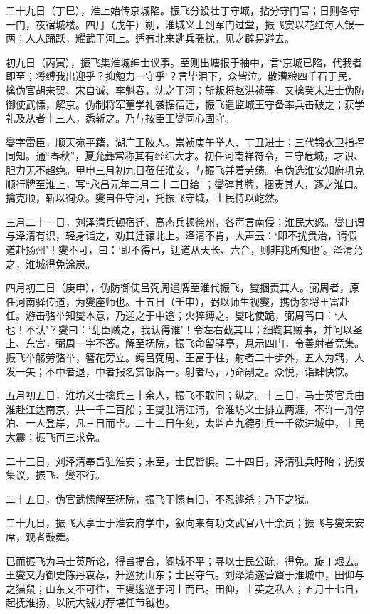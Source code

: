 \documentclass[]{article}
\begin{document}
二十九日（丁巳），淮上始传京城陷。振飞分设壮丁守城，拈分守门官；日则各守一门，夜宿城楼。四月（戊午）朔，淮城义士到军门过堂，振飞赏以花红每人银一两；人人踊跃，耀武于河上。适有北来逃兵骚扰，见之辟易避去。

初九日（丙寅），振飞集淮城绅士议事。至则出塘报于袖中，言`京城已陷，代我者即至；将缚我出迎乎？抑勉力一守乎'？言毕泪下，众皆泣。散漕粮四千石于民，擒伪官胡来贺、宋自诚、李魁春，沈之于河；斩叛将赵洪祯等，又擒癸未进士伪防御使武愫，解京。伪制将军董学礼袭据宿迁，振飞遣监城王守备率兵击破之；获学礼及从者十三人，悉斩之。乃与按臣王燮同心固守。

燮字雷臣，顺天宛平籍，湖广王陂人。崇祯庚午举人、丁丑进士；三代锦衣卫指挥同知。通``春秋''，夏允彝常称其有经纬大才。初任河南祥符令，三守危城，才识、胆力无不超绝。甲申三月初九日莅任淮安，与振飞并着劳绩。有伪选淮安知府巩克顺行牌至淮上，写``永昌元年二月二十二日给''；燮碎其牌，捆责其人，逐之淮口。擒克顺，斩以徇众。燮自任守河，托振飞守城，士民恃以屹然。

三月二十一日，刘泽清兵顿宿迁、高杰兵顿徐州，各声言南侵；淮民大怒。燮自谓与泽清有识，轻身诣之，劝其迁辕北上。泽清不肯，大声云：`即不扰贵治，请假道赴扬州'！燮不可，曰：`即不得已，迂道从天长、六合，则非我所知也'。泽清允之，淮城得免涂炭。

四月初三日（庚申），伪防御使吕弼周遣牌至淮代振飞，燮捆责其人。弼周者，原任河南驿传道，为燮座师也。十五日（壬申），弼以师生视燮，携伪参将王富赴任。游击骆举知燮本意，乃迎之于中途；火猝缚之。燮叱使跪，弼周骂曰：`人也！不认'？燮曰：`乱臣贼之，我认得谁'！令左右截其耳；细鞫其贼事，并问以圣上、东宫，弼周一字不答。解至抚院，振飞命留驿亭，悬示四门，令善射者竞集。振飞举觞劳骆举，簪花旁立。缚吕弼周、王富于柱，射者二十步外，五人为耦，人发一矢；不中者退，中者报名赏银牌一。射者尽，乃命剐之。众悦，诣肆快饮。

五月初五日，淮坊义士擒兵三十余人，振飞不敢问；纵之。十三日，马士英官兵由淮赴江达南京，共一千二百船；王燮驻清江浦，令淮坊义士排立两涯，不许一舟停泊、一人登岸，凡三日而毕。二十二日午刻，太监卢九德引兵一千欲进城中，士民大震；振飞再三求免。

二十三日，刘泽清奉旨驻淮安；未至，士民皆惧。二十四日，泽清驻兵盱眙；抚按集议，振飞、燮不行。

二十五日，伪官武愫解至抚院，振飞于愫有旧，不忍遽杀；乃下之狱。

二十九日，振飞大享士于淮安府学中，叙向来有功文武官八十余员；振飞与燮亲安席，观者鼓舞。

已而振飞为马士英所论，得旨提合，阁城不平；寻以士民公疏，得免。旋丁艰去。王燮又为御史陈丹衷荐，升巡抚山东；士民夺气。刘泽清遂营窟于淮城中，田仰与之猫鼠；山东又不可往，王燮逡巡于河上而已。田仰，士英之私人；五月十七日，起抚淮扬，以阮大铖力荐堪任节钺也。
\end{document}

